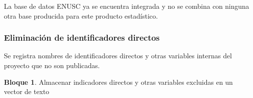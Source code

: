 \documentclass[]{book}
\newenvironment{Shaded}{\begin{snugshade}}{\end{snugshade}}
\newcommand{\KeywordTok}[1]{\textcolor[rgb]{0.13,0.29,0.53}{\textbf{#1}}}
\newcommand{\NormalTok}[1]{#1}
\newcommand{\OperatorTok}[1]{\textcolor[rgb]{0.81,0.36,0.00}{\textbf{#1}}}
\newcommand{\StringTok}[1]{\textcolor[rgb]{0.31,0.60,0.02}{#1}}
\theoremstyle{definition}
\theoremstyle{definition}
\newtheorem{example}{Bloque}[chapter]
\theoremstyle{definition}
\theoremstyle{definition}
\theoremstyle{remark}
\begin{document}
La base de datos ENUSC ya se encuentra integrada y no se combina con ninguna otra base producida para este producto estadístico.

\hypertarget{eliminaciuxf3n-de-identificadores-directos}{%
\subsubsection{Eliminación de identificadores directos}\label{eliminaciuxf3n-de-identificadores-directos}}

Se registra nombres de identificadores directos y otras variables internas del proyecto que no son publicadas.

\begin{example}
\protect\hypertarget{exm:bloque26nbm}{}{\label{exm:bloque26nbm} }Almacenar indicadores directos y otras variables excluidas en un vector de texto
\end{example}

\begin{Shaded}
\end{Shaded}
\end{document}
